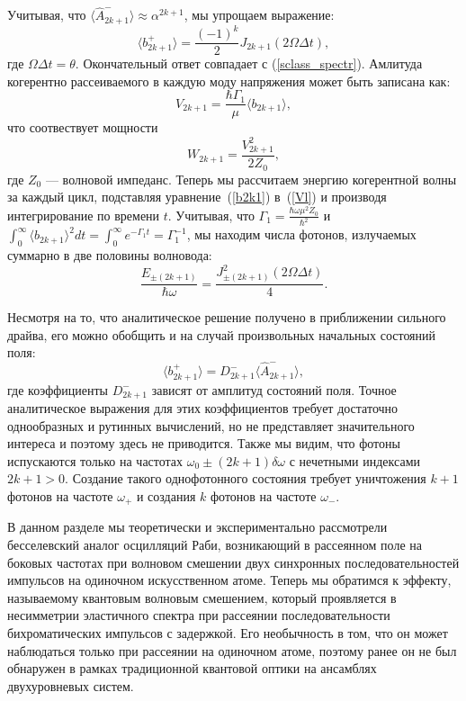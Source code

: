 Учитывая, что $\langle \hat{A}^-_{2k+1} \rangle \approx \alpha^{2k+1}$, мы упрощаем выражение:
\begin{equation}
	\langle b^+_{2k+1}\rangle = \frac{(-1)^k}{2} J_{2k+1}(2\Omega \Delta t),  
	\label{b2k1}
\end{equation}
где $\Omega \Delta t = \theta$. Окончательный ответ совпадает с  (\ref{sclass_spectr}).
Амлитуда когерентно рассеиваемого в каждую моду напряжения может быть записана как:  
\begin{equation}
	V_{2k+1} = \frac{\hbar \Gamma_1}{\mu}\langle b_{2k+1} \rangle, 
\end{equation}
что соотвествует мощности 
\begin{equation}
	W_{2k+1} = \frac{V^2_{2k+1}}{2Z_0} , 
\end{equation}
где $Z_0$ --- волновой импеданс. Теперь мы рассчитаем энергию когерентной волны за каждый цикл, подставляя уравнение~(\ref{b2k1}) в~(\ref{Vl}) и производя интегрирование по времени $t$. Учитывая, что $\Gamma_1 = \frac{\hbar\omega \mu^2 Z_0}{\hbar^2}$ и $\int_0^\infty \langle b_{2k+1} \rangle^2 dt = \int_0^\infty e^{-\Gamma_1t} = \Gamma_1^{-1}$, мы находим числа фотонов, излучаемых суммарно в две половины волновода:
\begin{equation}
	\frac{E_{\pm(2k+1)}}{\hbar\omega} = \frac{J^2_{\pm(2k+1)}(2\Omega \Delta t)}{4}.
\end{equation} 

Несмотря на то, что аналитическое решение получено в приближении сильного драйва, его можно обобщить и на случай произвольных начальных состояний поля:
\begin{equation}
	\langle b^+_{2k+1}\rangle = D^-_{2k+1}\langle\hat{A}_{2k+1}^{-}\rangle,
	\label{bg}
\end{equation}
где коэффициенты $D^-_{2k+1}$ зависят от амплитуд состояний поля. Точное аналитическое выражения для этих коэффициентов требует достаточно однообразных и рутинных вычислений, но не представляет значительного интереса и поэтому здесь не приводится. Также мы видим, что фотоны испускаются только на частотах $\omega_0 \pm (2k+1)\delta\omega$ с нечетными индексами $2k+1 > 0$. Создание такого однофотонного состояния требует уничтожения $k+1$ фотонов на частоте $\omega_+$ и создания $k$ фотонов на частоте $\omega_-$. 

В данном разделе мы теоретически и экспериментально рассмотрели бесселевский аналог осцилляций Раби, возникающий в рассеянном поле на боковых частотах при волновом смешении двух синхронных последовательностей импульсов на одиночном искусственном атоме. Теперь мы обратимся к эффекту, называемому квантовым волновым смешением, который проявляется в несимметрии эластичного спектра при рассеянии последовательности бихроматических импульсов с задержкой. Его необычность в том, что он может наблюдаться только при рассеянии на одиночном атоме, поэтому ранее он не был обнаружен в рамках традиционной квантовой оптики на ансамблях двухуровневых систем. 
